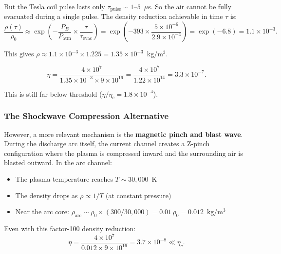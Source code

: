 \documentclass[11pt,a4paper]{article}
\begin{document}
But the Tesla coil pulse lasts only $\tau_{\mathrm{pulse}} \sim 1$--$5$~$\mu$s.
So the air cannot be fully evacuated during a single pulse. The density reduction
achievable in time $\tau$ is:
\begin{equation}
\frac{\rho(\tau)}{\rho_0} \approx \exp\!\left(-\frac{P_B}{P_{\mathrm{atm}}} \times \frac{\tau}{\tau_{\mathrm{evac}}}\right)
= \exp\!\left(-393 \times \frac{5 \times 10^{-6}}{2.9 \times 10^{-4}}\right)
= \exp(-6.8) = 1.1 \times 10^{-3}.
\end{equation}

This gives $\rho \approx 1.1 \times 10^{-3} \times 1.225 = 1.35 \times 10^{-3}$~kg/m$^3$.

\begin{equation}
\eta = \frac{4 \times 10^7}{1.35 \times 10^{-3} \times 9 \times 10^{16}}
= \frac{4 \times 10^7}{1.22 \times 10^{14}} = 3.3 \times 10^{-7}.
\end{equation}

This is still far below threshold ($\eta/\eta_c = 1.8 \times 10^{-4}$).

\subsubsection{The Shockwave Compression Alternative}

However, a more relevant mechanism is the \textbf{magnetic pinch and blast wave}.
During the discharge arc itself, the current channel creates a Z-pinch configuration
where the plasma is compressed inward and the surrounding air is blasted outward.
In the arc channel:
\begin{itemize}
\item The plasma temperature reaches $T \sim 30{,}000$~K
\item The density drops as $\rho \propto 1/T$ (at constant pressure)
\item Near the arc core: $\rho_{\mathrm{arc}} \sim \rho_0 \times (300/30{,}000) = 0.01\,\rho_0
= 0.012$~kg/m$^3$
\end{itemize}

Even with this factor-100 density reduction:
\begin{equation}
\eta = \frac{4 \times 10^7}{0.012 \times 9 \times 10^{16}} = 3.7 \times 10^{-8} \ll \eta_c.
\end{equation}
\end{document}
